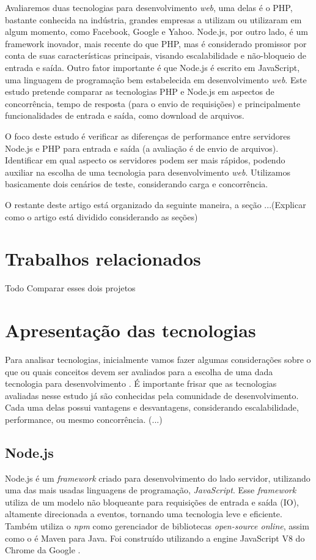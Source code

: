 \documentclass[conference,compsoc]{IEEEtran}
\begin{document}
Avaliaremos duas tecnologias para desenvolvimento \textit{web}, uma delas é o PHP, bastante conhecida na indústria, grandes empresas a utilizam ou utilizaram em algum momento, como Facebook, Google e Yahoo. Node.js, por outro lado, é um framework inovador, mais recente do que PHP, mas é considerado promissor por conta de suas características principais, visando escalabilidade e não-bloqueio de entrada e saída. Outro fator importante é que Node.js é escrito em JavaScript, uma linguagem de programação bem estabelecida em desenvolvimento \textit{web}. Este estudo pretende comparar as tecnologias PHP e Node.js em aspectos de concorrência, tempo de resposta (para o envio de requisições) e principalmente funcionalidades de entrada e saída, como download de arquivos. 

O foco deste estudo é verificar as diferenças de performance entre servidores Node.js e PHP para entrada e saída (a avaliação é de envio de arquivos). Identificar em qual aspecto os servidores podem ser mais rápidos, podendo auxiliar na escolha de uma tecnologia para desenvolvimento \textit{web}. Utilizamos basicamente dois cenários de teste, considerando carga e concorrência.

O restante deste artigo está organizado da seguinte maneira, a seção ...(Explicar como o artigo está dividido considerando as seções)

\section{Trabalhos relacionados}
Todo 
Comparar esses dois projetos 
\cite{performance_comparison}
\cite{nodejs_viable_option}


\section{Apresentação das tecnologias}
Para analisar tecnologias, inicialmente vamos fazer algumas considerações sobre o que ou quais conceitos devem ser avaliados para a escolha de uma dada tecnologia para desenvolvimento . É importante frisar que as tecnologias avaliadas nesse estudo já são conhecidas pela comunidade de desenvolvimento. Cada uma delas possui vantagens e desvantagens, considerando escalabilidade, performance, ou mesmo concorrência. (...)

\subsection{Node.js}
Node.js é um \textit{framework} criado para desenvolvimento do lado servidor, utilizando uma das mais usadas linguagens de programação, \textit{JavaScript}. Esse \textit{framework} utiliza de um modelo não bloqueante para requisições de entrada e saída (IO), altamente direcionada a eventos, tornando uma tecnologia leve e eficiente. Também utiliza o \textit{npm} como gerenciador de bibliotecas \textit{open-source online}, assim como o é Maven para Java. Foi construído utilizando a engine JavaScript V8 do Chrome da Google \cite{node_js_oficial}.
\end{document}
